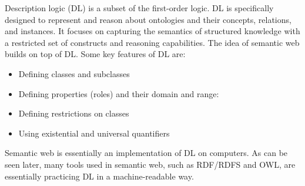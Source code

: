 Description logic (DL) is a subset of the first-order logic. DL is specifically designed to represent and reason about ontologies and their concepts, relations, and instances. It focuses on capturing the semantics of structured knowledge with a restricted set of constructs and reasoning capabilities. The idea of semantic web builds on top of DL.  Some key features of DL are:
\begin{itemize}
  \item Defining classes and subclasses
  \item Defining properties (roles) and their domain and range:
  \item Defining restrictions on classes
  \item Using existential and universal quantifiers
\end{itemize}
Semantic web is essentially an implementation of DL on computers. As can be seen later, many tools used in semantic web, such as RDF/RDFS and OWL, are essentially practicing DL in a machine-readable way.










